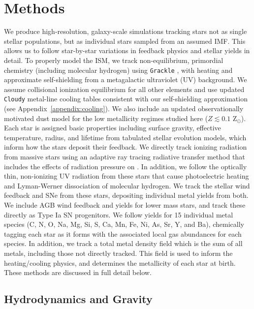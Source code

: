 \documentclass[twocolumn]{aastex61}
\begin{document}
\section{Methods}
\label{sec:methods}
We produce high-resolution, galaxy-scale simulations tracking stars not as single stellar populations, but as individual stars sampled from an assumed IMF.
This allows us to follow star-by-star variations in feedback physics and stellar yields in detail. To properly model the ISM, we track non-equilibrium, primordial chemistry (including molecular hydrogen) using \texttt{Grackle} \citep{GrackleMethod}, with heating and approximate self-shielding from a metagalactic ultraviolet (UV) background. We assume collisional ionization equilibrium for all other elements and use updated \texttt{Cloudy} metal-line cooling tables consistent with our self-shielding approximation (see Appendix~\ref{appendix:cooling}). We also include an updated observationally motivated dust model for the low metallicity regimes studied here ($Z \lesssim 0.1$ Z$_{\odot}$). Each star is assigned basic properties including surface gravity, effective temperature, radius, and lifetime from tabulated stellar evolution models, which inform how the stars deposit their feedback. We directly track ionizing radiation from massive stars using an adaptive ray tracing radiative transfer method that includes the effects of radiation pressure on . In addition, we follow the optically thin, non-ionizing UV radiation from these stars that cause photoelectric heating and Lyman-Werner dissociation of molecular hydrogen. We track the stellar wind feedback and SNe from these stars, depositing individual metal yields from both. We include AGB wind feedback and yields for lower mass stars, and track these directly as Type Ia SN progenitors. We follow yields for 15 individual metal species (C, N, O, Na, Mg, Si, S, Ca, Mn, Fe, Ni, As, Sr, Y, and Ba), chemically tagging each star as it forms with the associated local gas abundances for each species. In addition, we track a total metal density field which is the sum of all metals, including those not directly tracked. This field is used to inform the heating/cooling physics, and determines the metallicity of each star at birth. These methods are discussed in full detail below.

\subsection{Hydrodynamics and Gravity}
\label{sec:hydro}
\end{document}
